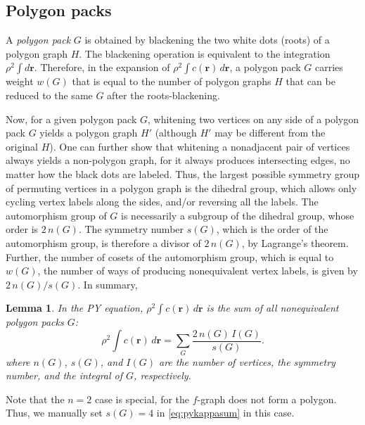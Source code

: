 \documentclass[preprint]{revtex4-1}
\newtheorem{lemm}[thrm]{Lemma}
\newcommand{\vct}[1]{\mathbf{#1}}
\providecommand{\vr}{} %
\renewcommand{\vr}{\vct{r}}
\begin{document}
\subsection{Polygon packs}



A \emph{polygon pack} $G$ is obtained
  by blackening the two white dots (roots) of a polygon graph $H$.
%
The blackening operation is equivalent to the integration $\rho^2 \int d\vr$.
%
Therefore, in the expansion of $\rho^2 \int c(\vr) \, d\vr$,
  a polygon pack $G$ carries weight $w(G)$
  that is equal to the number of polygon graphs $H$ that
  can be reduced to the same $G$ after the roots-blackening.

Now, for a given polygon pack $G$,
  whitening two vertices on any side of
  a polygon pack $G$
  yields a polygon graph $H'$
  (although $H'$ may be different from the original $H$).
%
One can further show that
  whitening a nonadjacent pair of vertices always yields
  a non-polygon graph,
  for it always produces intersecting edges,
  no matter how the black dots are labeled.
%
Thus,
  the largest possible symmetry group of
  permuting vertices in a polygon graph
  is the dihedral group,
  which allows only cycling vertex labels along the sides,
  and/or reversing all the labels.
%
The automorphism group of $G$
  is necessarily a subgroup of the dihedral group,
  whose order is $2 \, n(G)$.
%
The symmetry number $s(G)$,
  which is the order of the automorphism group,
  is therefore a divisor of $2 \, n(G)$,
  by Lagrange's theorem.
%
Further,
  the number of cosets of the automorphism group,
  which is equal to $w(G)$, the number of ways of
  producing nonequivalent vertex labels,
  is given by $2 \, n(G) / s(G)$.
%
In summary,
\begin{lemm}
In the PY equation,
  $\rho^2 \int c(\vr) \, d\vr$ is the sum of
  all nonequivalent polygon packs $G$:
  \begin{equation}
      \rho^2 \int c(\vr) \, d\vr
    = \sum_{G} \frac{ 2 \, n(G) \, I(G) }{ s(G) }.
  \label{eq:pykappasum}
  \end{equation}
  where $n(G)$, $s(G)$, and $I(G)$ are
  the number of vertices,
  the symmetry number,
  and the integral of $G$,
  respectively.
  \label{thm:pykappasum}
\end{lemm}
%
Note that the $n = 2$ case is special,
  for the $f$-graph does not form a polygon.
Thus, we manually set $s(G) = 4$ in \eqref{eq:pykappasum} in this case.
\end{document}
